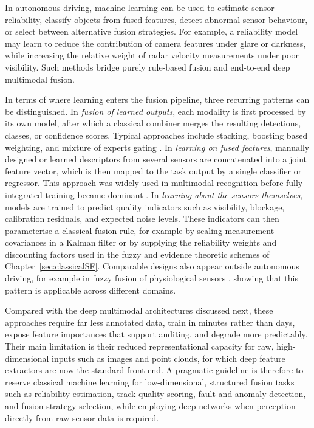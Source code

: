 \documentclass[11pt,oneside,openany]{book}
\newcommand{\addednew}[1]{\textcolor{RevisionOlive}{#1}}
\begin{document}
In autonomous driving, machine learning can be used to estimate sensor reliability, classify objects from fused features, detect abnormal sensor behaviour, or select between alternative fusion strategies. For example, a reliability model may learn to reduce the contribution of camera features under glare or darkness, while increasing the relative weight of radar velocity measurements under poor visibility. Such methods bridge purely rule-based fusion and end-to-end deep multimodal fusion.

\addednew{In terms of where learning enters the fusion pipeline, three recurring patterns can be distinguished. In \emph{fusion of learned outputs}, each modality is first processed by its own model, after which a classical combiner merges the resulting detections, classes, or confidence scores. Typical approaches include stacking, boosting based weighting, and mixture of experts gating \cite{breiman2001_rf,khaleghi_multisensor_2013}. In \emph{learning on fused features}, manually designed or learned descriptors from several sensors are concatenated into a joint feature vector, which is then mapped to the task output by a single classifier or regressor. This approach was widely used in multimodal recognition before fully integrated training became dominant \cite{atrey_multimodal_2010,gao_survey_2020}. In \emph{learning about the sensors themselves}, models are trained to predict quality indicators such as visibility, blockage, calibration residuals, and expected noise levels. These indicators can then parameterise a classical fusion rule, for example by scaling measurement covariances in a Kalman filter or by supplying the reliability weights and discounting factors used in the fuzzy and evidence theoretic schemes of Chapter~\ref{sec:classicalSF}. Comparable designs also appear outside autonomous driving, for example in fuzzy fusion of physiological sensors \cite{testa_fuzzyfusion_2025}, showing that this pattern is applicable across different domains.}

\addednew{Compared with the deep multimodal architectures discussed next, these approaches require far less annotated data, train in minutes rather than days, expose feature importances that support auditing, and degrade more predictably. Their main limitation is their reduced representational capacity for raw, high-dimensional inputs such as images and point clouds, for which deep feature extractors \cite{guo_deep_2019} are now the standard front end. A pragmatic guideline is therefore to reserve classical machine learning for low-dimensional, structured fusion tasks such as reliability estimation, track-quality scoring, fault and anomaly detection, and fusion-strategy selection, while employing deep networks when perception directly from raw sensor data is required.}
\end{document}
